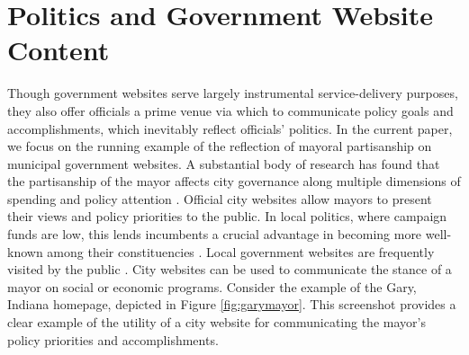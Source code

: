 \documentclass[11pt]{article}
\begin{document}

\vspace{-.2cm}
\section{Politics and Government Website Content} \vspace{-.2cm}


 Though government websites serve largely instrumental service-delivery purposes, they also offer officials a prime venue via which to communicate policy goals and accomplishments, which inevitably reflect officials' politics. In the current paper, we focus on the running example of the reflection of mayoral partisanship on municipal government websites. A substantial body of research has found that the partisanship of the mayor affects city governance along multiple dimensions of spending and policy attention \citep{gerber2011mayors,de2016mayoral,einstein2016mayors,marion2013mayor}. Official city websites allow mayors to present their views and policy priorities to the public. In local politics, where campaign funds are low, this lends incumbents a crucial advantage in becoming more well-known among their constituencies \citep{stanyer2008elected}. Local government websites are frequently visited by the public \citep{thomas2003new}. City websites can be used to communicate the stance of a mayor on social or economic programs. Consider the example of the Gary, Indiana homepage, depicted in Figure \ref{fig:garymayor}.  This screenshot provides a clear example of the utility of a city website for communicating the mayor's policy priorities and accomplishments.
 
\end{document}

